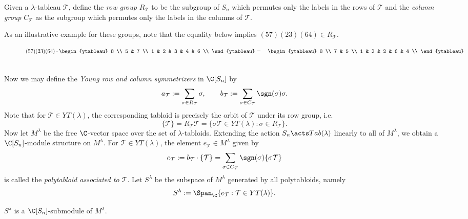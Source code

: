 \documentclass[../main.tex]{subfiles}
\begin{document}
\begin{definition}\label{def:rowandcolgroup}
  Given a $ \lambda $-tableau $ \mathcal{T} $, define the \textit{row group} $ R_{\mathcal{T}} $ to be the subgroup of $ S_{n} $ which permutes only the labels in the rows of $ \mathcal{T} $ and the \textit{column group} $ C_{\mathcal{T}} $ as the subgroup which permutes only the labels in the columns of $ \mathcal{T} $. 
\end{definition}
As an illustrative example for these groups, note that the equality below implies $ (57)(23)(64)\in R_{\mathcal{T}} $.
\begin{figure}[h]
\captionsetup{
  font=small, %
  labelfont=bf,
  format=plain, %
  justification=raggedright, %
  singlelinecheck=false, %
}
\centering
{}
\[
  (57)(23)(64)\cdot
\begin{ytableau}
8 \\
5 & 7 \\
1 & 2 & 3 & 4 & 6 \\
\end{ytableau}
=\quad
\begin{ytableau}
8 \\
7 & 5 \\
1 & 3 & 2 & 6 & 4 \\
\end{ytableau}
\]
\end{figure}\\
Now we may define the \textit{Young row and column symmetrizers} in $ \C[S_{n}] $ by
\begin{equation}\label{eq:rowandcolsymm}
  a_{\mathcal{T}} := \sum_{\sigma\in R_{\mathcal{T}}} \sigma, \qquad b_{\mathcal{T}} := \sum_{\sigma\in C_{\mathcal{T}}} \sgn(\sigma) \sigma.
\end{equation}
Note that for $ \mathcal{T}\in YT(\lambda) $, the corresponding tabloid is precisely the orbit of $ \mathcal{T} $ under its row group, i.e. 
\[
  \{\mathcal{T}\} = R_{\mathcal{T}}\mathcal{T} = \{\sigma \mathcal{T}\in YT(\lambda) : \sigma\in R_{\mathcal{T}}\}.
\]
Now let $ M^{\lambda} $ be the free $ \C $-vector space over the set of $ \lambda $-tabloids. Extending the action $ S_{n}\acts Tab(\lambda) $ linearly to all of $ M^{\lambda} $, we obtain a $ \C[S_{n}] $-module structure on $ M^{\lambda} $. For $ \mathcal{T}\in YT(\lambda) $, the element $ e_{\mathcal{T}}\in M^{\lambda} $ given by
\[
  e_{\mathcal{T}} := b_{\mathcal{T}}\cdot \{\mathcal{T}\} = \sum_{\sigma\in C_{\mathcal{T}}} \sgn(\sigma) \{\sigma \mathcal{T}\}
\]
is called the \textit{polytabloid associated to $\mathcal{T}$}.
Let $ S^{\lambda} $ be the subspace of $ M^{\lambda} $ generated by all polytabloids, namely
\[
  S^{\lambda}:=\Span_{\C}\{e_{\mathcal{T}} : \mathcal{T}\in YT(\lambda)\}.
\]
\begin{claim}
  $ S^{\lambda} $ is a $ \C[S_{n}] $-submodule of $ M^{\lambda} $.
\end{claim}
\end{document}
